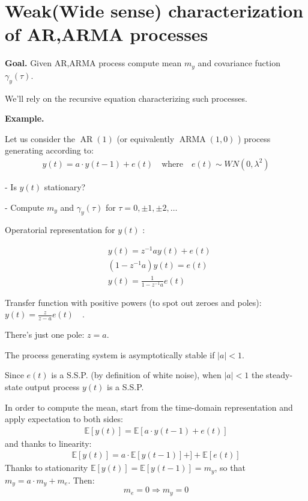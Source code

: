 
\section{Weak(Wide sense) characterization of AR,ARMA processes}
\textbf{Goal.} Given AR,ARMA process compute mean $m_y$ and covariance fuction $\gamma_y(\tau)$.


We'll rely on the recursive equation characterizing such processes.

\textbf{Example.}

Let us consider the $\operatorname{AR}(1)$ (or equivalently $\operatorname{ARMA}(1,0)$ ) process generating according to:
\begin{align*}
	y(t)=a \cdot y(t-1)+e(t) \quad \text{where} \quad e(t) \sim W N\left(0, \lambda^{2}\right)
\end{align*}

- Is $y(t)$ stationary?

- Compute $m_{y}$ and $\gamma_{y}(\tau)$ for $\tau=0, \pm 1, \pm 2, \ldots$

Operatorial representation for $y(t)$ :

\begin{align*}
	&y(t)=z^{-1} a y(t)+e(t) \\
	&\left(1-z^{-1} a\right) y(t)=e(t) \\
	&y(t)=\frac{1}{1-z^{-1} a} e(t)
\end{align*}

Transfer function with positive powers (to spot out zeroes and poles): $y(t)=\frac{z}{z-a} e(t) \quad$.

There's just one pole: $z=a .$

The process generating system is asymptotically stable if $|a| <1$. 

Since $e(t)$ is a S.S.P. (by definition of white noise), when $|a| <1$ the steady-state output process $y(t)$ is a S.S.P.

In order to compute the mean, start from the time-domain representation and apply expectation to 
both sides:
\begin{align*}
	\mathbb{E}[y(t)]=\mathbb{E}[a \cdot y(t-1)+e(t)]
\end{align*}
and thanks to linearity:
\begin{align*}
	\mathbb{E}[y(t)]=a \cdot \mathbb{E}[y(t-1)]+]+\mathbb{E}[e(t)]
\end{align*}
Thanks to stationarity $\mathbb{E}[y(t)]=\mathbb{E}[y(t-1)]=m_{y}$, so that $m_{y}=a \cdot m_{y}+m_{e}$.
Then:
$$
m_{e}=0 \Rightarrow m_{y}=0
$$

